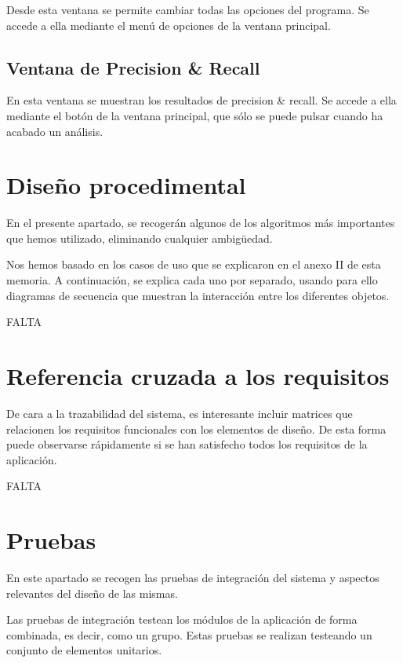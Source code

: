 Desde esta ventana se permite cambiar todas las opciones del programa. Se accede a ella mediante el menú de opciones de la ventana principal.

\subsection{Ventana de Precision \& Recall}


En esta ventana se muestran los resultados de precision \& recall. Se accede a ella mediante el botón de la ventana principal, que sólo se puede pulsar cuando ha acabado un análisis.

\newpage

\section{Diseño procedimental}
En el presente apartado, se recogerán algunos de los algoritmos más importantes que hemos utilizado, eliminando cualquier ambigüedad.

Nos hemos basado en los casos de uso que se explicaron en el anexo II de esta memoria. A continuación, se explica cada uno por separado, usando para ello diagramas de secuencia que muestran la interacción entre los diferentes objetos.

FALTA

\section{Referencia cruzada a los requisitos}
De cara a la trazabilidad del sistema, es interesante incluir matrices que relacionen los requisitos funcionales con los elementos de diseño. De esta forma puede observarse rápidamente si se han satisfecho todos los requisitos de la aplicación.

FALTA

\section{Pruebas}
En este apartado se recogen las pruebas de integración del sistema y aspectos relevantes del diseño de las mismas.

Las pruebas de integración testean los módulos de la aplicación de forma combinada, es decir, como un grupo. Estas pruebas se realizan testeando un conjunto de elementos unitarios.

